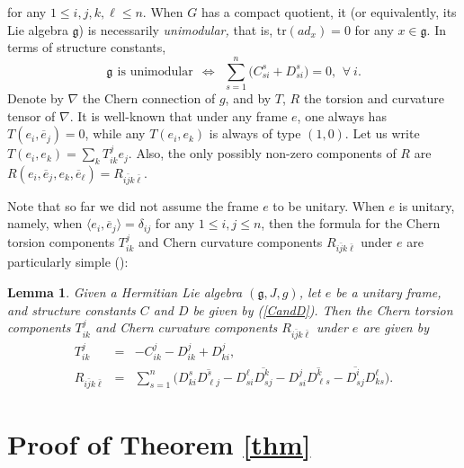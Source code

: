 \documentclass{amsart}
\newtheorem{lemma}{Lemma}
\begin{document}
for any $1\leq i,j,k,\ell\leq n$. When $G$ has a compact quotient, it (or equivalently, its Lie algebra ${\mathfrak g}$) is necessarily {\em unimodular,} that is,  $\mbox{tr}(ad_x)=0$ for any $x\in {\mathfrak g}$. In terms of structure constants, 
\begin{equation*} \label{unimodular}
{\mathfrak g} \ \, \mbox{is unimodular}  \ \ \Longleftrightarrow  \ \ \sum_{s=1}^n \big( C^s_{si} + D^s_{si}\big) =0 , \, \ \forall \ i.
\end{equation*}
Denote by  $\nabla$ the Chern connection of $g$, and by $T$, $R$ the torsion and curvature tensor of $\nabla$. It is well-known that under any frame $e$, one always has $T( e_i, \overline{e}_j)=0$, while any $T(e_i,e_k)$ is always of type $(1,0)$. Let us write $ T(e_i,e_k) = \sum_k T^j_{ik}e_j$. Also, the only possibly non-zero components of $R$ are $R(e_i, \overline{e}_j , e_k, \overline{e}_{\ell}) =R_{i\bar{j}k\bar{\ell}}$. 

Note that so far we did not assume the frame $e$ to be unitary. When $e$ is unitary, namely, when $\langle e_i, \overline{e}_j\rangle = \delta_{ij}$ for any $1\leq i,j\leq n$, then the formula for the Chern torsion components $T^j_{ik}$ and Chern curvature components $R_{i\bar{j}k\bar{\ell}}$  under $e$ are particularly simple (\cite{GuoZ2, LZ}):

\begin{lemma}  \label{lemma2}
Given a Hermitian Lie algebra $({\mathfrak g}, J,g)$, let $e$ be a unitary frame, and structure constants $C$ and $D$ be given by (\ref{CandD}). Then the Chern torsion components $T^j_{ik}$ and Chern curvature components  $R_{i\bar{j}k\bar{\ell}}$  under $e$ are given by
\begin{eqnarray} 
  T^j_{ik} & = &  - C^j_{ik} -   D^{j}_{i k} + D^{j}_{k i} , \label{torsion} \\
 R_{i\bar{j}k\bar{\ell}} & = &  \sum_{s=1}^n \big( D^s_{ki}\overline{D^s_{\ell j}} - D^{\ell}_{si}\overline{D^k_{s j}} - D^j_{si}\overline{D^k_{ \ell s}} - \overline{D^i_{sj}} D^{\ell}_{k s} \big) . \label{curvature}
\end{eqnarray}
\end{lemma}


\vspace{0.3cm}



\section{Proof of Theorem \ref{thm}}
\end{document}
